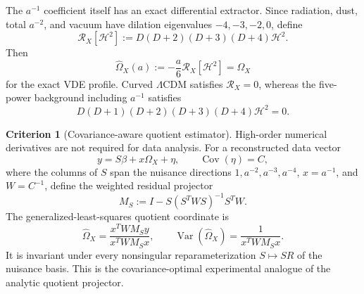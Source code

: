 \documentclass[11pt,a4paper]{article}
\def\Dil{D}%
\numberwithin{equation}{section}
\theoremstyle{definition}
\newtheorem{criterion}{Criterion}
\theoremstyle{plain}
\theoremstyle{remark}
\newcommand{\Dil}{\mathscr{D}}
\begin{document}
The \(a^{-1}\) coefficient itself has an exact differential extractor. Since radiation, dust, total \(a^{-2}\), and vacuum have dilation eigenvalues \(-4,-3,-2,0\), define
\begin{equation}
\mathcal R_X[\mathcal H^2]
:=\Dil(\Dil+2)(\Dil+3)(\Dil+4)\mathcal H^2.
\end{equation}
Then
\begin{equation}
\boxed{
\widehat\Omega_X(a)
:=-\frac a6\mathcal R_X[\mathcal H^2]
=\Omega_X
}
\end{equation}
for the exact VDE profile. Curved \(\Lambda\)CDM satisfies \(\mathcal R_X=0\), whereas the five-power background including \(a^{-1}\) satisfies
\begin{equation}
\Dil(\Dil+1)(\Dil+2)(\Dil+3)(\Dil+4)\mathcal H^2=0.
\end{equation}

\begin{criterion}[Covariance-aware quotient estimator]
High-order numerical derivatives are not required for data analysis. For a reconstructed data vector
\begin{equation}
y=S\beta+x\Omega_X+\eta,
\qquad
\operatorname{Cov}(\eta)=C,
\end{equation}
where the columns of \(S\) span the nuisance directions \(1,a^{-2},a^{-3},a^{-4}\), \(x=a^{-1}\), and \(W=C^{-1}\), define the weighted residual projector
\begin{equation}
M_S:=I-S(S^TWS)^{-1}S^TW.
\end{equation}
The generalized-least-squares quotient coordinate is
\begin{equation}
\boxed{
\widehat\Omega_X
=\frac{x^TWM_Sy}{x^TWM_Sx},
\qquad
\operatorname{Var}(\widehat\Omega_X)
=\frac{1}{x^TWM_Sx}.
}
\end{equation}
It is invariant under every nonsingular reparameterization \(S\mapsto SR\) of the nuisance basis. This is the covariance-optimal experimental analogue of the analytic quotient projector.
\end{criterion}
\end{document}

